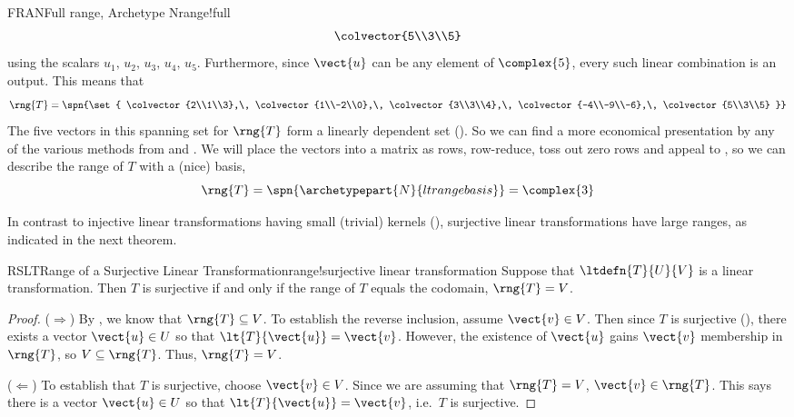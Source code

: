 \begin{example}{FRAN}{Full range, Archetype N}{range!full}
\begin{align*}
\colvector{5\\3\\5}
\end{align*}
%
using the scalars $u_1,\,u_2,\,u_3,\,u_4,\,u_5$.  Furthermore, since $\vect{u}$ can be any element of $\complex{5}$, every such linear combination is an output.  This means that 
%
\begin{equation*}
\rng{T}=\spn{\set{
\colvector{2\\1\\3},\,
\colvector{1\\-2\\0},\,
\colvector{3\\3\\4},\,
\colvector{-4\\-9\\-6},\,
\colvector{5\\3\\5}
}}
\end{equation*}
%
The five vectors in this spanning set for $\rng{T}$ form a linearly dependent set ().  So we can find a more economical presentation by any of the various methods from  and .  We will place the vectors into a matrix as rows, row-reduce, toss out zero rows and appeal to , so we can describe the range of $T$ with a (nice) basis,
%
\begin{equation*}
\rng{T}=\spn{\archetypepart{N}{ltrangebasis}}=\complex{3}
\end{equation*}
%
\end{example}
%
In contrast to injective linear transformations having small (trivial) kernels (), surjective linear transformations have large ranges, as indicated in the next theorem.
%
\begin{theorem}{RSLT}{Range of a Surjective Linear Transformation}{range!surjective linear transformation}
Suppose that $\ltdefn{T}{U}{V}$ is a linear transformation.  Then $T$ is surjective if and only if the range of $T$ equals the codomain, $\rng{T}=V$.
\end{theorem}
%
\begin{proof}
($\Rightarrow$) By , we know that $\rng{T}\subseteq V$.  To establish the reverse inclusion, assume $\vect{v}\in V$.  Then since $T$ is surjective (), there exists a vector $\vect{u}\in U$ so that $\lt{T}{\vect{u}}=\vect{v}$.  However, the existence of $\vect{u}$ gains $\vect{v}$ membership in $\rng{T}$, so $V\subseteq\rng{T}$.  Thus, $\rng{T}=V$.\par
%
($\Leftarrow$)  To establish that $T$ is surjective, choose $\vect{v}\in V$.  Since we are assuming that $\rng{T}=V$, $\vect{v}\in\rng{T}$.  This says there is a vector $\vect{u}\in U$ so that $\lt{T}{\vect{u}}=\vect{v}$, i.e.\ $T$ is surjective.
%
\end{proof}
